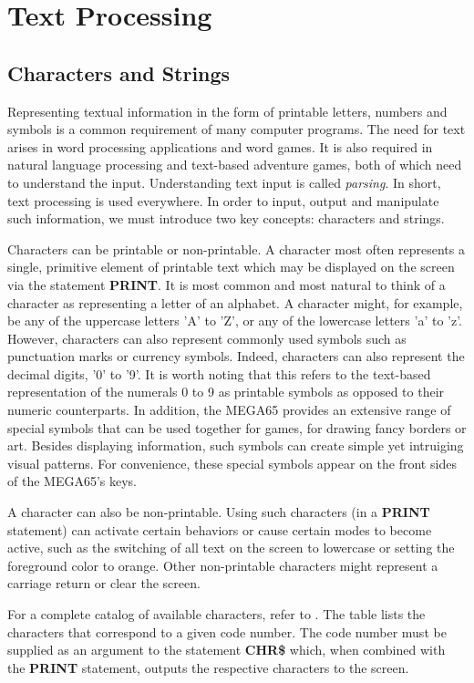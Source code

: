 \chapter{Text Processing}

\section{Characters and Strings}
Representing textual information in the form of printable letters, numbers and symbols is a common requirement of many computer programs. The need for text arises in word processing applications and word games. It is also required in natural language processing and text-based adventure games, both of which need to understand the input. Understanding text input is called {\it parsing}. In short, text processing is used everywhere. In order to input, output and manipulate such information, we must introduce two key concepts: characters and strings.

Characters can be printable or non-printable. A character most often represents a single, primitive element of printable text which may be displayed on the screen via the statement {\bf PRINT}. It is most common and most natural to think of a character as representing a letter of an alphabet. A character might, for example, be any of the uppercase letters 'A' to 'Z', or any of the lowercase letters 'a' to 'z'. However, characters can also represent commonly used symbols such as punctuation marks or currency symbols. Indeed, characters can also represent the decimal digits, '0' to '9'. It is worth noting that this refers to the text-based representation of the numerals 0 to 9 as printable symbols as opposed to their numeric counterparts. In addition, the MEGA65 provides an extensive range of special symbols that can be used together for games, for drawing fancy borders or art. Besides displaying information, such symbols can create simple yet intruiging visual patterns. For convenience, these special symbols appear on the front sides of the MEGA65's keys.

A character can also be non-printable. Using such characters (in a {\bf PRINT} statement) can activate certain behaviors or cause certain modes to become active, such as the switching of all text on the screen to lowercase or setting the foreground color to orange. Other non-printable characters might represent a carriage return or clear the screen.

For a complete catalog of available characters, refer to . The table lists the characters that correspond to a given code number. The code number must be supplied as an argument to the statement {\bf CHR\$} which, when combined with the {\bf PRINT} statement, outputs the respective characters to the screen.

